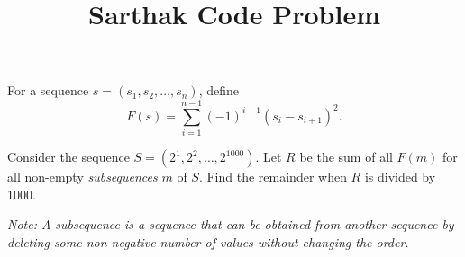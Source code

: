 \documentclass[11pt]{scrartcl}
\title{Sarthak Code Problem}
\begin{document}
For a sequence $s = (s_{1}, s_{2}, \dots, s_{n})$, define
\[F(s) = \sum_{i = 1}^{n - 1} (-1)^{i + 1}(s_{i} - s_{i + 1})^{2}.\]

Consider the sequence $S = (2^{1}, 2^{2}, \dots, 2^{1000})$. Let $R$ be the sum of all 
$F(m)$ for all non-empty \emph{subsequences} $m$ of $S$. Find the remainder when $R$ is divided by 1000.

\emph{Note: A subsequence is a sequence that can be obtained from another sequence by deleting some non-negative number of values without changing the order.}
\end{document}
